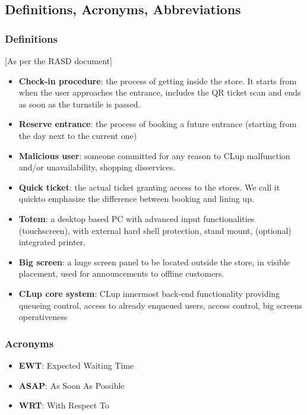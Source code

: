 \subsection{Definitions, Acronyms, Abbreviations}
\subsubsection{Definitions\label{subsub:definitions}}
[As per the RASD document]\newline
\begin{itemize}
\item \textbf{Check-in procedure}: the process of getting inside the store. It starts from when the user approaches the entrance, includes the QR ticket scan and ends as soon as the turnstile is passed.
\item \textbf{Reserve entrance}: the process of booking a future entrance (starting from the day next to the current one)
\item \textbf{Malicious user}: someone committed for any reason to CLup malfunction and/or unavailability, shopping disservices.
\item \textbf{Quick ticket}: the actual ticket granting access to the stores. We call it \guillemotleft quick\guillemotright \space to emphasize the difference between booking and lining up.
\item \textbf{Totem}: a desktop based PC with advanced input functionalities (touchscreen), with external hard shell protection, stand mount, (optional) integrated printer.
\item \textbf{Big screen}: a huge screen panel to be located outside the store, in visible placement, used for announcements to offline customers.
\item \textbf{CLup core system\label{core_functionality}}: CLup innermost back-end functionality providing queueing control, access to already enqueued users, access control, big screens operativeness                                                                                                                                                                                                   \end{itemize}
\subsubsection{Acronyms}
\begin{itemize}
\item \textbf{EWT}: Expected Waiting Time
\item \textbf{ASAP}: As Soon As Possible
\item \textbf{WRT}: With Respect To
\end{itemize}

